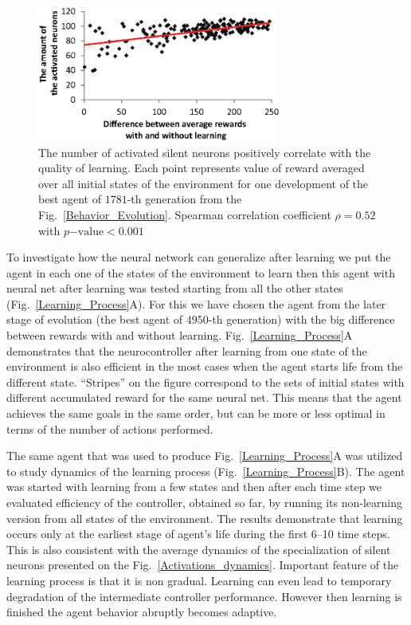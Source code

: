\documentclass[letterpaper]{article}
\begin{document}
\begin{figure} %
	\begin{center}
	\includegraphics[width=8cm]{Fig5.eps}
	\caption{The number of activated silent neurons positively correlate with the quality of learning. Each point represents value of reward averaged over all initial states of the environment for one development of the best agent of $1781$-th generation from the Fig.~\ref{Behavior_Evolution}. Spearman correlation coefficient $\rho=0.52$ with $p\mathrm{-value}<0.001$}
	\label{Neurons_Learning_Correlation}
	\end{center}
\end{figure}

To investigate how the neural network can generalize after learning we put the agent in each one of the states of the environment to learn then this agent with neural net after learning was tested starting from all the other states (Fig.~\ref{Learning_Process}A). For this we have chosen the agent from the later stage of evolution (the best agent of $4950$-th generation) with the big difference between rewards with and without learning. Fig.~\ref{Learning_Process}A demonstrates that the neurocontroller after learning from one state of the environment is also efficient in the most cases  when the agent starts life from the different state. ``Stripes'' on the figure correspond to the sets of initial states with different accumulated reward for the same neural net. This means that the agent achieves the same goals in the same order, but can be more or less optimal in terms of the number of actions performed. 

The same agent that was used to produce Fig.~\ref{Learning_Process}A was utilized to study dynamics of the learning process (Fig.~\ref{Learning_Process}B). The agent was started with learning from a few states and then after each time step we evaluated efficiency of the controller, obtained so far, by running its non-learning version from all states of the environment. The results demonstrate that  learning occurs only at the earliest stage of agent's life during the first 6--10 time steps. This is also consistent with the average dynamics of the specialization of silent neurons presented on the Fig.~\ref{Activations_dynamics}. Important feature of the learning process is that it is non gradual. Learning can even lead to temporary degradation of the intermediate controller performance. However then learning is finished the agent behavior abruptly becomes adaptive.
\end{document}
